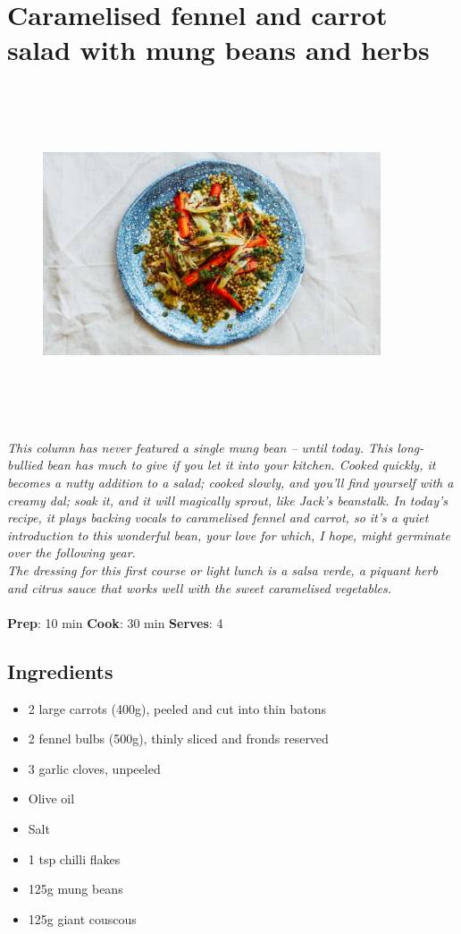 \documentclass{book}
\begin{document}
\section{Caramelised fennel and carrot salad with mung beans and herbs}
\begin{figure}
\centering\includegraphics[width=10cm,height=10cm,keepaspectratio]{Recipe_Pictures/Caramelised_fennel_and_carrot_salad_with_mung_beans_and_herbs.png}
\end{figure}
\emph{This column has never featured a single mung bean – until today. This long-bullied bean has much to give if you let it into your kitchen. Cooked quickly, it becomes a nutty addition to a salad; cooked slowly, and you’ll find yourself with a creamy dal; soak it, and it will magically sprout, like Jack’s beanstalk. In today’s recipe, it plays backing vocals to caramelised fennel and carrot, so it’s a quiet introduction to this wonderful bean, your love for which, I hope, might germinate over the following year.\\ 
The dressing for this first course or light lunch is a salsa verde, a piquant herb and citrus sauce that works well with the sweet caramelised vegetables.}\\\\ 
\textbf{Prep}: 10 min
\textbf{Cook}: 30 min
\textbf{Serves}: 4
\subsection*{Ingredients}
\begin{itemize}
\item 2 large carrots (400g), peeled and cut into thin batons
\item 2 fennel bulbs (500g), thinly sliced and fronds reserved
\item 3 garlic cloves, unpeeled
\item Olive oil
\item Salt
\item 1 tsp chilli flakes
\item 125g mung beans
\item 125g giant couscous
\end{itemize}
\end{document}
